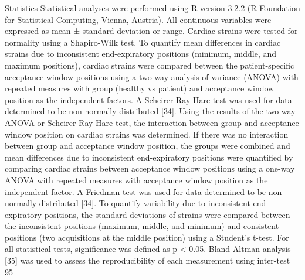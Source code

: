 	Statistics
	Statistical analyses were performed using R version 3.2.2 (R Foundation for Statistical Computing, Vienna, Austria). All continuous variables were expressed as mean ± standard deviation or range. Cardiac strains were tested for normality using a Shapiro-Wilk test.
	To quantify mean differences in cardiac strains due to inconsistent end-expiratory positions (minimum, middle, and maximum positions), cardiac strains were compared between the patient-specific acceptance window positions using a two-way analysis of variance (ANOVA) with repeated measures with group (healthy vs patient) and acceptance window position as the independent factors. A Scheirer-Ray-Hare test was used for data determined to be non-normally distributed [34]. Using the results of the two-way ANOVA or Scheirer-Ray-Hare test, the interaction between group and acceptance window position on cardiac strains was determined. If there was no interaction between group and acceptance window position, the groups were combined and mean differences due to inconsistent end-expiratory positions were quantified by comparing cardiac strains between acceptance window positions using a one-way ANOVA with repeated measures with acceptance window position as the independent factor. A Friedman test was used for data determined to be non-normally distributed [34].
	To quantify variability due to inconsistent end-expiratory positions, the standard deviations of strains were compared between the inconsistent positions (maximum, middle, and minimum) and consistent positions (two acquisitions at the middle position) using a Student’s t-test. For all statistical tests, significance was defined as p < 0.05. Bland-Altman analysis [35] was used to assess the reproducibility of each measurement using inter-test 95%
